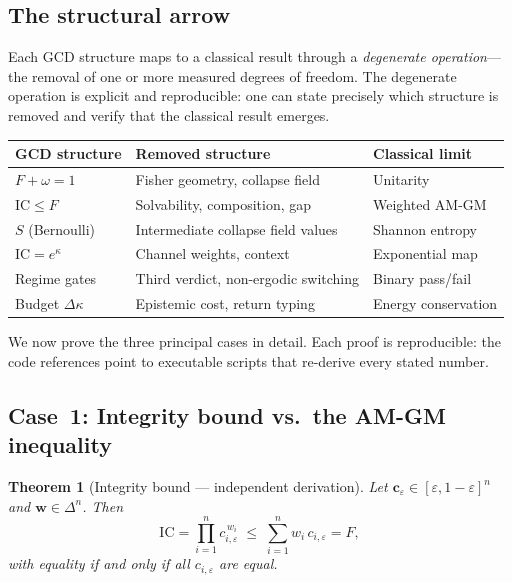 \documentclass[
  aps,
  prd,
  twocolumn,
  superscriptaddress,
  nofootinbib,
  floatfix
]{revtex4-2}
\newtheorem{theorem}{Theorem}
\newcommand{\eps}{\varepsilon}
\newcommand{\beq}{\begin{equation}}
\newcommand{\eeq}{\end{equation}}
\newcommand{\tvec}{\mathbf{c}}
\newcommand{\wvec}{\mathbf{w}}
\newcommand{\IC}{\mathrm{IC}}
\begin{document}
\subsection{The structural arrow}

Each GCD structure maps to a classical result through a
\emph{degenerate operation}---the removal of one or more
measured degrees of freedom.  The degenerate operation is
explicit and reproducible: one can state precisely which
structure is removed and verify that the classical result
emerges.

\begin{center}
{\small\begin{tabular}{@{}lp{2.5cm}l@{}}
\toprule
\textbf{GCD structure} & \textbf{Removed structure} & \textbf{Classical limit} \\
\midrule
$F + \omega = 1$ & Fisher geometry, collapse field & Unitarity \\
$\IC \leq F$ & Solvability, composition, gap & Weighted AM-GM \\
$S$ (Bernoulli) & Intermediate collapse field values & Shannon entropy \\
$\IC = e^\kappa$ & Channel weights, context & Exponential map \\
Regime gates & Third verdict, non-ergodic switching & Binary pass/fail \\
Budget $\Delta\kappa$ & Epistemic cost, return typing & Energy conservation \\
\bottomrule
\end{tabular}}
\end{center}

We now prove the three principal cases in detail.  Each proof
is reproducible: the code references point to executable
scripts that re-derive every stated number.

\subsection{Case~1: Integrity bound vs.\ the AM-GM inequality}

\begin{theorem}[Integrity bound --- independent derivation]
\label{thm:icf}
Let $\tvec_\eps \in [\eps, 1{-}\eps]^n$ and
$\wvec \in \Delta^n$.  Then
\beq
  \IC = \prod_{i=1}^n c_{i,\eps}^{\,w_i}
  \;\leq\;
  \sum_{i=1}^n w_i\, c_{i,\eps} = F,
\eeq
with equality if and only if all $c_{i,\eps}$ are equal.
\end{theorem}
\end{document}

